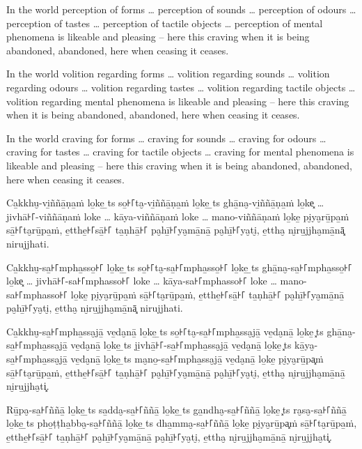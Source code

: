In the world perception of forms \ldots{} perception of sounds \ldots{}
perception of odours \ldots{} perception of tastes \ldots{} perception of
tactile objects \ldots{} perception of mental phenomena is likeable and pleasing
-- here this craving when it is being abandoned, abandoned, here when ceasing it
ceases.

In the world volition regarding forms \ldots{} volition regarding sounds
\ldots{} volition regarding odours \ldots{} volition regarding tastes \ldots{}
volition regarding tactile objects \ldots{} volition regarding mental phenomena
is likeable and pleasing -- here this craving when it is being abandoned,
abandoned, here when ceasing it ceases.

In the world craving for forms \ldots{} craving for sounds \ldots{} craving for
odours \ldots{} craving for tastes \ldots{} craving for tactile objects \ldots{}
craving for mental phenomena is likeable and pleasing -- here this craving when
it is being abandoned, abandoned, here when ceasing it ceases.

\paliPage

Ca̱kkhu̮-vi̱ññā̱ṇa̱ṁ lo̱ke̱ \ldo̱ts{} so̱꜔꜒ta̮-vi̱ññā̱ṇa̱ṁ lo̱ke̱ \ldo̱ts{} ghā̱na̮-vi̱ññā̱ṇa̱ṁ lo̱ke͓
\ldots{} jivhā꜔꜒-viññāṇaṁ loke \ldots{} kāya-viññāṇaṁ loke \ldots{} mano-viññāṇaṁ
lo̱ke̱ pi̮ya̮rū̱pa̱ṁ sā̱꜔꜒ta̮rū̱pa̱ṁ, e̱tthe̱꜔꜒sā̱꜔꜒ ta̱ṇhā̱꜔꜒ pa̮hī̱꜔꜒ya̮mā̱nā̱ pa̮hī̱꜔꜒ya̮ti̮, e̱ttha̮ ni̮ru̱jjha̮mā̱nā͓
nirujjhati.

Ca̱kkhu̮-sa̱꜔꜒mpha̱sso̱꜔꜒ lo̱ke̱ \ldo̱ts{} so̱꜔꜒ta̮-sa̱꜔꜒mpha̱sso̱꜔꜒ lo̱ke̱ \ldo̱ts{} ghā̱na̮-sa̱꜔꜒mpha̱sso̱꜔꜒ lo̱ke͓
\ldots{} jivhā꜔꜒-sa꜔꜒mphasso꜔꜒ loke \ldots{} kāya-sa꜔꜒mphasso꜔꜒ loke \ldots{} mano-sa꜔꜒mphasso꜔꜒
lo̱ke̱ pi̮ya̮rū̱pa̱ṁ sā̱꜔꜒ta̮rū̱pa̱ṁ, e̱tthe̱꜔꜒sā̱꜔꜒ ta̱ṇhā̱꜔꜒ pa̮hī̱꜔꜒ya̮mā̱nā̱ pa̮hī̱꜔꜒ya̮ti̮, e̱ttha̮ ni̮ru̱jjha̮mā̱nā͓
nirujjhati.

Ca̱kkhu̮-sa̱꜔꜒mpha̱ssa̮jā̱ ve̱da̮nā̱ lo̱ke̱ \ldo̱ts{} so̱꜔꜒ta̮-sa̱꜔꜒mpha̱ssa̮jā̱ ve̱da̮nā̱ lo̱ke̱ \ldo͓ts{}
ghā̱na̮-sa̱꜔꜒mpha̱ssa̮jā̱ ve̱da̮nā̱ lo̱ke̱ \ldo̱ts{} ji̱vhā̱꜔꜒-sa̱꜔꜒mpha̱ssa̮jā̱ ve̱da̮nā̱ lo̱ke̱ \ldo͓ts{}
kā̱ya̮-sa̱꜔꜒mpha̱ssa̮jā̱ ve̱da̮nā̱ lo̱ke̱ \ldo̱ts{} ma̮no̱-sa̱꜔꜒mpha̱ssa̮jā̱ ve̱da̮nā̱ lo̱ke̱ pi̮ya̮rū̱pa͓ṁ
sā̱꜔꜒ta̮rū̱pa̱ṁ, e̱tthe̱꜔꜒sā̱꜔꜒ ta̱ṇhā̱꜔꜒ pa̮hī̱꜔꜒ya̮mā̱nā̱ pa̮hī̱꜔꜒ya̮ti̮, e̱ttha̮ ni̮ru̱jjha̮mā̱nā̱ ni̮ru̱jjha̮ti͓.

Rū̱pa̮-sa̱꜔꜒ññā̱ lo̱ke̱ \ldo̱ts{} sa̱dda̮-sa̱꜔꜒ññā̱ lo̱ke̱ \ldo̱ts{} ga̱ndha̮-sa̱꜔꜒ññā̱ lo̱ke̱ \ldo͓ts{}
ra̮sa̮-sa̱꜔꜒ññā̱ lo̱ke̱ \ldo̱ts{} pho̱ṭṭha̱bba̮-sa̱꜔꜒ññā̱ lo̱ke̱ \ldo̱ts{} dha̱mma̮-sa̱꜔꜒ññā̱ lo̱ke̱ pi̮ya̮rū̱pa͓ṁ
sā̱꜔꜒ta̮rū̱pa̱ṁ, e̱tthe̱꜔꜒sā̱꜔꜒ ta̱ṇhā̱꜔꜒ pa̮hī̱꜔꜒ya̮mā̱nā̱ pa̮hī̱꜔꜒ya̮ti̮, e̱ttha̮ ni̮ru̱jjha̮mā̱nā̱ ni̮ru̱jjha̮ti͓.

